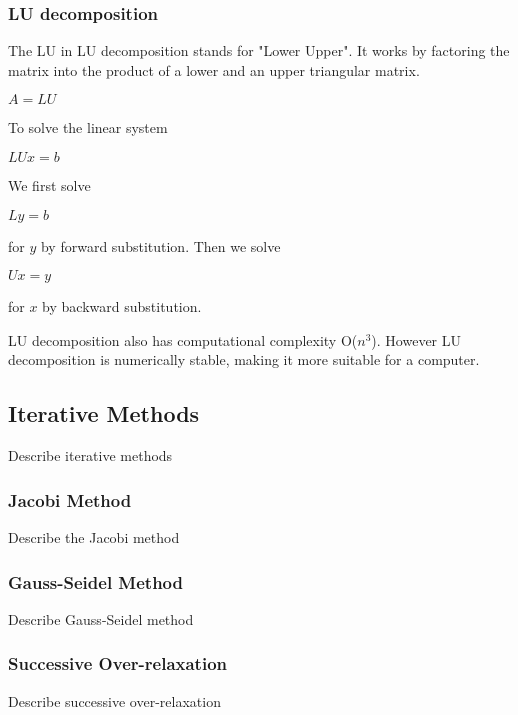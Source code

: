 \subsubsection*{LU decomposition}

The LU in LU decomposition stands for "Lower Upper". It works by factoring the 
matrix into the product of a lower and an upper triangular matrix. 

$A = LU$

To solve the linear system 

$LUx = b$

We first solve 

$Ly = b$

for $y$ by forward substitution. Then we solve 

$Ux = y$

for $x$ by backward substitution.

LU decomposition also has computational complexity O($n^3$). However LU decomposition 
is numerically stable, making it more suitable for a computer.

\subsection*{Iterative Methods}

Describe iterative methods

\subsubsection*{Jacobi Method}

Describe the Jacobi method

\subsubsection*{Gauss-Seidel Method}

Describe Gauss-Seidel method

\subsubsection*{Successive Over-relaxation}

Describe successive over-relaxation
